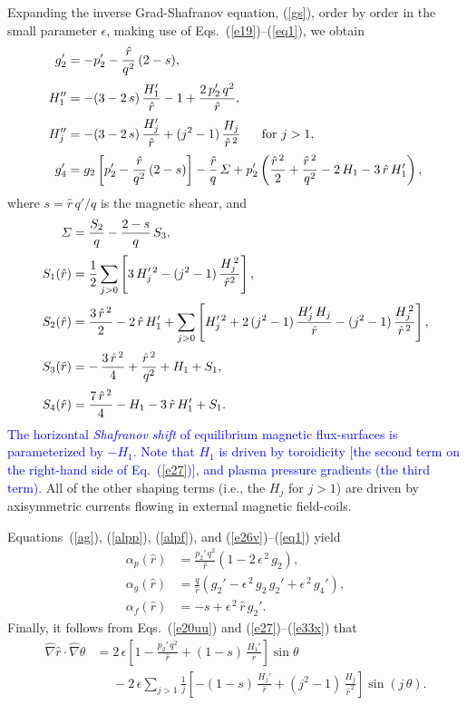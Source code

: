 \documentclass[12pt,prb,aps]{revtex4-1}
\begin{document}
Expanding the inverse Grad-Shafranov equation, (\ref{gs}), order by order in the
small parameter $\epsilon$, making use of Eqs.~(\ref{e19})--(\ref{eq1}), we obtain\,\cite{am1,tj,tj1}
\begin{align}
g_2'&=- p_2' - \frac{\hat{r}}{q^2}\,(2-s),\label{e26}\\[0.5ex]
H_1''&= -(3-2\,s)\,\frac{H_1' }{\hat{r}}
-1+\frac{2\,p_2'\,q^2}{\hat{r}},\label{e27}\\[0.5ex]
H_j''&= -(3-2\,s)\,\frac{H_j'}{\hat{r}}+(j^2-1)\,\frac{H_j}{\hat{r}^{\,2}}~~~~~\mbox{for $j>1$},\label{e33x}\\[0.5ex]
g_4'&= g_2\left[p_2' - \frac{\hat{r}}{q^2}\,(2-s)\right] - \frac{\hat{r}}{q}\,{\mit\Sigma}
+p_2'\left(\frac{\hat{r}^{\,2}}{2}+\frac{\hat{r}^{\,2}}{q^2}-2\,H_1-3\,\hat{r}\,H_1'\right),\label{e31}
\end{align}
where $s=\hat{r}\,q'/q$ is the magnetic shear, and  
\begin{align}
{\mit\Sigma} &=\frac{S_2}{q}- \frac{2-s}{q}\,S_3,\label{el1}\\[0.5ex]
S_1(\hat{r})&=\frac{1}{2}\sum_{j>0} \left[3\,H_j'^{\,2} -(j^2-1)\,\frac{H_j^{\,2}}{\hat{r}^2}\right],\label{e109}
\\[0.5ex]
S_2(\hat{r})&=\frac{3\,\hat{r}^{\,2}}{2} -2\,\hat{r}\,H_1'+\sum_{j>0}\left[H_j'^{\,2}+2\,(j^2-1)\,\frac{H_j'\,H_j}{\hat{r}}-(j^2-1)\,\frac{H_j^{\,2}}{\hat{r}^{\,2}}\right],\\[0.5ex]
S_3(\hat{r})&=-\,\frac{3\,\hat{r}^{\,2}}{4}+\frac{\hat{r}^{\,2}}{q^2} +H_1+S_1,\\[0.5ex]
S_4(\hat{r}) &= \frac{7\,\hat{r}^{\,2}}{4}-H_1 -3\,\hat{r}\,H_1' + S_1.\label{el5}
\end{align}
\textcolor{blue}{The horizontal {\em Shafranov shift}\/ of equilibrium magnetic flux-surfaces is parameterized by $-H_1$.
Note that $H_1$ is driven by toroidicity [the second term on
the right-hand side of Eq.~(\ref{e27})], and plasma pressure gradients (the third term). }All of the other shaping terms (i.e., the $H_j$ for $j>1$) are driven by axisymmetric currents flowing in external  magnetic field-coils.

Equations~(\ref{ag}), (\ref{alpp}), (\ref{alpf}), and (\ref{e26v})--(\ref{eq1}) yield\,\cite{tj}
\begin{align}
\alpha_p(\hat{r}) &= \frac{p_2'\,q^2}{\hat{r}}\left(1-2\,\epsilon^{\,2}\,g_2\right),\\[0.5ex]
\alpha_g(\hat{r}) &= \frac{q}{\hat{r}}\left(g_2' -\epsilon^{\,2}\,g_2\,g_2'+\epsilon^{\,2}\,g_4'\right),\\[0.5ex]
\alpha_f(\hat{r}) &= -s + \epsilon^{\,2}\,\hat{r}\,g_2'.
\end{align}
Finally, it follows from Eqs.~(\ref{e20uu}) and (\ref{e27})--(\ref{e33x}) that
\begin{align}\label{e114}
\hat{\nabla}\hat{r}\cdot\hat{\nabla}\theta &= 2\,\epsilon\left[1-\frac{p_2'\,q^2}{\hat{r}} +(1-s)\,\frac{H_1'}{\hat{r}}\right]\sin\theta\nonumber\\[0.5ex]
&\phantom{=}-2\,\epsilon\sum_{j>1}\frac{1}{j}\left[-(1-s)\,\frac{H_j'}{\hat{r}} + (j^2-1)\,\frac{H_j}{\hat{r}^{\,2}}\right]\sin(j\,\theta).
\end{align}
\end{document}
